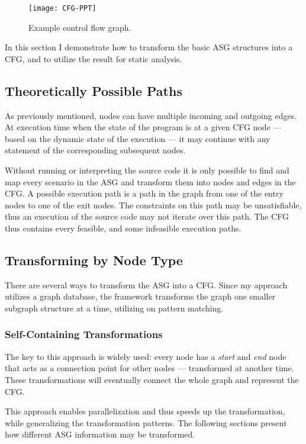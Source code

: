 \begin{figure}[htbp]
  \centering
  \texttt{[image: CFG-PPT]}
  \caption{Example control flow graph.}
  \label{fig:CFG-PPT}
\end{figure}

In this section I demonstrate how to transform the basic ASG structures into a CFG, and to utilize the result for static analysis.

\subsection{Theoretically Possible Paths}
\label{sect:cfg-paths}
As previously mentioned, nodes can have multiple incoming and outgoing edges. At execution time when the state of the program is at a given CFG node --- based on the dynamic state of the execution --- it may continue with any statement of the corresponding subsequent nodes.

Without running or interpreting the source code it is only possible to find and map every scenario in the ASG and transform them into nodes and edges in the CFG. A possible execution path is a path in the graph from one of the entry nodes to one of the exit nodes. The constraints on this path may be unsatisfiable, thus an execution of the source code may not iterate over this path. The CFG thus contains every feasible, and some infeasible execution paths.

\subsection{Transforming by Node Type}
There are several ways to transform the ASG into a CFG. Since my approach utilizes a graph database, the framework transforms the graph one smaller subgraph structure at a time, utilizing on pattern matching.

\subsubsection{Self-Containing Transformations}
The key to this approach is widely used: every node has a \emph{start} and \emph{end} node that acts as a connection point for other nodes --- transformed at another time. These transformations will eventually connect the whole graph and represent the CFG.

This approach enables parallelization and thus speeds up the transformation, while generalizing the transformation patterns. The following sections present how different ASG information may be transformed.

